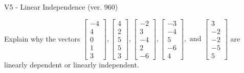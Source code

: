 \begin{exercise}
  \begin{exerciseTitle}V5 - Linear Independence (ver. 960)\end{exerciseTitle}
  \begin{exerciseStatement}
    Explain why the vectors \(\left[\begin{array}{r}
-4 \\
4 \\
0 \\
1 \\
3
\end{array}\right] , \left[\begin{array}{r}
4 \\
2 \\
5 \\
5 \\
3
\end{array}\right] , \left[\begin{array}{r}
-2 \\
3 \\
-4 \\
2 \\
-6
\end{array}\right] , \left[\begin{array}{r}
-3 \\
-4 \\
5 \\
-6 \\
4
\end{array}\right] , \text{ and } \left[\begin{array}{r}
3 \\
-2 \\
-2 \\
-5 \\
5
\end{array}\right]\) are linearly dependent or linearly independent.	



\end{exerciseStatement}
\end{exercise}
